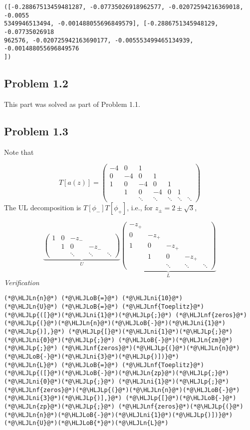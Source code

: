 \documentclass[12pt,landscape]{article}
\newcommand{\HLJLn}[1]{#1}
\newcommand{\HLJLnf}[1]{\textcolor[RGB]{66,102,213}{#1}}
\newcommand{\HLJLni}[1]{\textcolor[RGB]{59,151,46}{#1}}
\newcommand{\HLJLoB}[1]{\textcolor[RGB]{102,102,102}{\textbf{#1}}}
\newcommand{\HLJLp}[1]{#1}
\def\sopmatrix#1{ \begin{pmatrix}#1\end{pmatrix} }
\begin{document}
{\begin{lstlisting}
([-0.28867513459481287, -0.07735026918962577, -0.02072594216369018, -0.0055
5349946513494, -0.001488055696849579], [-0.2886751345948129, -0.07735026918
962576, -0.020725942163690177, -0.005553499465134939, -0.001488055696849576
])
\end{lstlisting}


\subsection{Problem 1.2}
This part was solved as part of Problem 1.1.

\subsection{Problem 1.3}
Note that

\[
T[a(z)] = \sopmatrix{
-4 & 0 & 1 \\
0 & -4 & 0 & 1 \\
1 & 0 & -4 & 0 & 1 \\
& 1& 0 & -4 & 0 & 1 \\
&&\ddots &\ddots &\ddots &\ddots &\ddots
}
\]
The UL decomposition is $T[\phi_-] T[\phi_+]$, i.e., for $z_{\pm} = 2 \pm \sqrt3$,

\[
\underbrace{\sopmatrix{
1 & 0 & -z_- \\
& 1 & 0 & -z_- \\
&&\ddots & \ddots & \ddots
}}_U
\underbrace{\sopmatrix{-z_+ \\
0 & -z_+ \\
1 & 0 & -z_+ \\
& 1 & 0 & -z_+ \\
&&\ddots & \ddots & \ddots
}}_L
\]
\emph{Verification}


\begin{lstlisting}
(*@\HLJLn{n}@*) (*@\HLJLoB{=}@*) (*@\HLJLni{10}@*)
(*@\HLJLn{U}@*) (*@\HLJLoB{=}@*) (*@\HLJLnf{Toeplitz}@*)(*@\HLJLp{([}@*)(*@\HLJLni{1}@*)(*@\HLJLp{;}@*) (*@\HLJLnf{zeros}@*)(*@\HLJLp{(}@*)(*@\HLJLn{n}@*)(*@\HLJLoB{-}@*)(*@\HLJLni{1}@*)(*@\HLJLp{)],}@*) (*@\HLJLp{[}@*)(*@\HLJLni{1}@*)(*@\HLJLp{;}@*) (*@\HLJLni{0}@*)(*@\HLJLp{;}@*) (*@\HLJLoB{-}@*)(*@\HLJLn{zm}@*)(*@\HLJLp{;}@*) (*@\HLJLnf{zeros}@*)(*@\HLJLp{(}@*)(*@\HLJLn{n}@*)(*@\HLJLoB{-}@*)(*@\HLJLni{3}@*)(*@\HLJLp{)])}@*)
(*@\HLJLn{L}@*) (*@\HLJLoB{=}@*) (*@\HLJLnf{Toeplitz}@*)(*@\HLJLp{([}@*)(*@\HLJLoB{-}@*)(*@\HLJLn{zp}@*)(*@\HLJLp{;}@*) (*@\HLJLni{0}@*)(*@\HLJLp{;}@*) (*@\HLJLni{1}@*)(*@\HLJLp{;}@*) (*@\HLJLnf{zeros}@*)(*@\HLJLp{(}@*)(*@\HLJLn{n}@*)(*@\HLJLoB{-}@*)(*@\HLJLni{3}@*)(*@\HLJLp{)],}@*) (*@\HLJLp{[}@*)(*@\HLJLoB{-}@*)(*@\HLJLn{zp}@*)(*@\HLJLp{;}@*) (*@\HLJLnf{zeros}@*)(*@\HLJLp{(}@*)(*@\HLJLn{n}@*)(*@\HLJLoB{-}@*)(*@\HLJLni{1}@*)(*@\HLJLp{)])}@*)
(*@\HLJLn{U}@*)(*@\HLJLoB{*}@*)(*@\HLJLn{L}@*)
\end{lstlisting}

}
\end{document}
